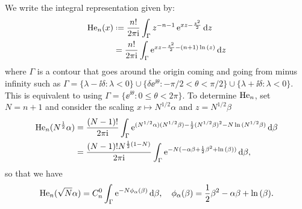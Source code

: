 \begin{exemplo}
	We write the integral representation given by:
	\begin{equation}
		\begin{split}
			\He_n(x) & \deff \frac{n!}{2\pi \ii} \int_{\Gamma} z^{-n-1} \ee^{xz-\frac{z^2}{2}} \dd z \\
			& = \frac{n!}{2\pi \ii} \int_{\Gamma} \ee^{xz-\frac{z^2}{2} - (n+1)\ln{(z)}} \dd z
		\end{split}
	\end{equation}
	where $\Gamma$ is a contour that goes around the origin coming and going from minus infinity such as $\Gamma = \{\lambda - \ii \delta : \lambda < 0 \} \cup \{\delta \ee^{\ii \theta}: -\pi/2 < \theta < \pi/2 \} \cup \{\lambda + \ii \delta : \lambda < 0 \}$. This is equivalent to using $\Gamma = \{\ee^{\ii \theta}: 0 \leq \theta < 2\pi \}$.	To determine $\mathrm{He}_{n}$, set $N = n + 1$ and consider the scaling $x \mapsto N^{1/2} \alpha$ and $z = N^{1/2} \beta$ 
	\begin{equation}
		\begin{split}
			\mathrm{He}_n(N^{\frac{1}{2}} \alpha) & = \frac{(N-1)!}{2\pi \mathrm{i}} \int_{\Gamma} \operatorname{e}^{(N^{1/2} \alpha)(N^{1/2} \beta)- \frac{1}{2}(N^{1/2} \beta)^2 - N\ln{(N^{1/2} \beta)}} \mathrm{d} \beta \\
			& =  \frac{(N-1)! N^{\frac{1}{2}\left(1-N\right)}}{2\pi \mathrm{i}} \int_{\Gamma}  \operatorname{e}^{-N(- \alpha \beta+ \frac{1}{2} \beta^2 + \ln{(\beta)})} \mathrm{d} \beta,
		\end{split}
	\end{equation}
	so that we have
	\begin{equation}
		\mathrm{He}_n(\sqrt{N}\alpha) = C_n^0 \int_{\Gamma}  \operatorname{e}^{-N \phi_\alpha(\beta) } \mathrm{d} \beta, \quad
		\phi_\alpha(\beta) = \frac{1}{2} \beta^2 - \alpha \beta + \ln{(\beta)}.
		\label{Equation: Hermite Integral}
	\end{equation}

\end{exemplo}
